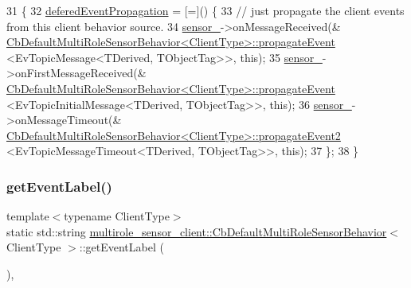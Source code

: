 \begin{DoxyCode}
31   \{
32     \hyperlink{classmultirole__sensor__client_1_1CbDefaultMultiRoleSensorBehavior_af49bfde7f78897b0e884faae69077013}{deferedEventPropagation} = [=]() \{
33       \textcolor{comment}{// just propagate the client events from this client behavior source.}
34       \hyperlink{classmultirole__sensor__client_1_1CbDefaultMultiRoleSensorBehavior_a5e4e65ada73da49c2b8579b422b97d0d}{sensor\_}->onMessageReceived(&
      \hyperlink{classmultirole__sensor__client_1_1CbDefaultMultiRoleSensorBehavior_aeb447d720b21e12fb77a2c433d3996bd}{CbDefaultMultiRoleSensorBehavior<ClientType>::propagateEvent}
      <EvTopicMessage<TDerived, TObjectTag>>, \textcolor{keyword}{this});
35       \hyperlink{classmultirole__sensor__client_1_1CbDefaultMultiRoleSensorBehavior_a5e4e65ada73da49c2b8579b422b97d0d}{sensor\_}->onFirstMessageReceived(&
      \hyperlink{classmultirole__sensor__client_1_1CbDefaultMultiRoleSensorBehavior_aeb447d720b21e12fb77a2c433d3996bd}{CbDefaultMultiRoleSensorBehavior<ClientType>::propagateEvent}
      <EvTopicInitialMessage<TDerived, TObjectTag>>, \textcolor{keyword}{this});
36       \hyperlink{classmultirole__sensor__client_1_1CbDefaultMultiRoleSensorBehavior_a5e4e65ada73da49c2b8579b422b97d0d}{sensor\_}->onMessageTimeout(&
      \hyperlink{classmultirole__sensor__client_1_1CbDefaultMultiRoleSensorBehavior_aa727751b652a5a9ea522bb5926925864}{CbDefaultMultiRoleSensorBehavior<ClientType>::propagateEvent2}
      <EvTopicMessageTimeout<TDerived, TObjectTag>>, \textcolor{keyword}{this});
37     \};
38   \}
\end{DoxyCode}
\mbox{\label{classmultirole__sensor__client_1_1CbDefaultMultiRoleSensorBehavior_ac1e1167956033fef3c059286da99d955}} 
\subsubsection{\texorpdfstring{get\+Event\+Label()}{getEventLabel()}}
{\footnotesize\ttfamily template$<$typename Client\+Type$>$ \\
static std\+::string \hyperlink{classmultirole__sensor__client_1_1CbDefaultMultiRoleSensorBehavior}{multirole\+\_\+sensor\+\_\+client\+::\+Cb\+Default\+Multi\+Role\+Sensor\+Behavior}$<$ Client\+Type $>$\+::get\+Event\+Label (\begin{DoxyParamCaption}{ }\end{DoxyParamCaption})\hspace{0.3cm}{\ttfamily [inline]}, {\ttfamily [static]}}



